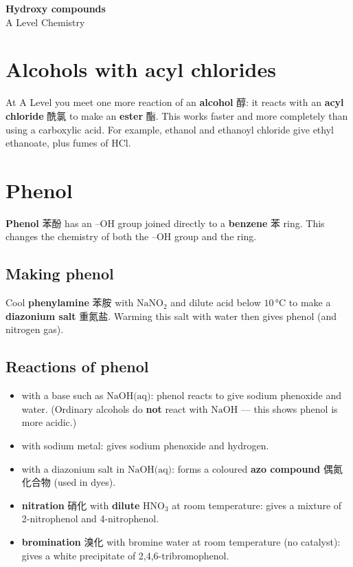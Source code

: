 \documentclass[11pt]{article}
\begin{document}
\begin{center}
  {\LARGE\bfseries Hydroxy compounds}\\[0.35em]
  {\large A Level Chemistry}
\end{center}
\vspace{0.6em}

\section*{Alcohols with acyl chlorides}

At A Level you meet one more reaction of an \textbf{alcohol} 醇: it reacts with an \textbf{acyl chloride} 酰氯 to make an \textbf{ester} 酯. This works faster and more completely than using a carboxylic acid. For example, ethanol and ethanoyl chloride give ethyl ethanoate, plus fumes of $\text{HCl}$.

\section*{Phenol}

\textbf{Phenol} 苯酚 has an $\text{–OH}$ group joined directly to a \textbf{benzene} 苯 ring. This changes the chemistry of both the $\text{–OH}$ group and the ring.

\subsection*{Making phenol}

Cool \textbf{phenylamine} 苯胺 with $\text{NaNO}_2$ and dilute acid below $10\,°\text{C}$ to make a \textbf{diazonium salt} 重氮盐. Warming this salt with water then gives phenol (and nitrogen gas).

\subsection*{Reactions of phenol}

\begin{itemize}
\item with a base such as $\text{NaOH(aq)}$: phenol reacts to give sodium phenoxide and water. (Ordinary alcohols do \textbf{not} react with $\text{NaOH}$ — this shows phenol is more acidic.)

\item with sodium metal: gives sodium phenoxide and hydrogen.

\item with a diazonium salt in $\text{NaOH(aq)}$: forms a coloured \textbf{azo compound} 偶氮化合物 (used in dyes).

\item \textbf{nitration} 硝化 with \textbf{dilute} $\text{HNO}_3$ at room temperature: gives a mixture of 2-nitrophenol and 4-nitrophenol.

\item \textbf{bromination} 溴化 with bromine water at room temperature (no catalyst): gives a white precipitate of 2,4,6-tribromophenol.

\end{itemize}
\end{document}
